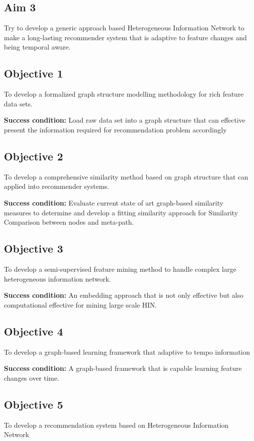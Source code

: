 \documentclass[12pt,a4 paper,title page]{article}
\begin{document}
\subsection*{Aim 3}
Try to develop a generic approach based Heterogeneous Information Network to make a long-lasting recommender system that is adaptive to feature changes and being temporal aware. 

\subsection*{Objective 1}
To develop a formalized graph structure modelling methodology for rich feature data sets. 

\textbf{Success condition:} Load raw data set into a graph structure that can effective present the information required for recommendation problem accordingly 

\subsection*{Objective 2} 
To develop a comprehensive similarity method based on graph structure that can applied into recommender systems. 

\textbf{Success condition:} Evaluate current state of art graph-based similarity measures to determine and develop a fitting similarity approach for Similarity Comparison between nodes and meta-path. 

\subsection*{Objective 3}
To develop a semi-supervised feature mining method to handle complex large heterogeneous information network. 

\textbf{Success condition:} An embedding approach that is not only effective but also computational effective for mining large scale HIN. 

\subsection*{Objective 4} 
To develop a graph-based learning framework that adaptive to tempo information 

\textbf{Success condition:} A graph-based framework that is capable learning feature changes over time. 

\subsection*{Objective 5} 
To develop a recommendation system based on Heterogeneous Information Network 
\end{document}
